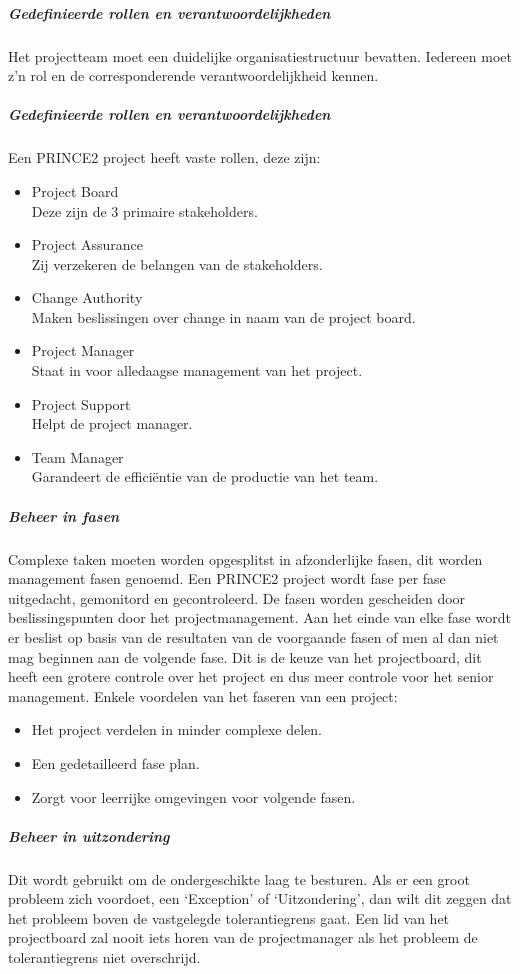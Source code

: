 \documentclass[]{article}
\begin{document}
\subparagraph{Gedefinieerde rollen en verantwoordelijkheden}
Het projectteam moet een duidelijke organisatiestructuur bevatten. Iedereen moet z’n rol en de corresponderende verantwoordelijkheid kennen.

\subparagraph{Gedefinieerde rollen en verantwoordelijkheden}
Een PRINCE2 project heeft vaste rollen, deze zijn:
\begin{itemize}
	\item Project Board \\ Deze zijn de 3 primaire stakeholders.
	\item Project Assurance \\ Zij verzekeren de belangen van de stakeholders.
	\item Change Authority \\ Maken beslissingen over change in naam van de project board.
	\item Project Manager \\ Staat in voor alledaagse management van het project.
	\item Project Support \\ Helpt de project manager.
	\item Team Manager \\ Garandeert de efficiëntie van de productie van het team.
	
\end{itemize}

\subparagraph{Beheer in fasen}
Complexe taken moeten worden opgesplitst in afzonderlijke fasen, dit worden management fasen genoemd. Een PRINCE2 project wordt fase per fase uitgedacht, gemonitord en gecontroleerd. De fasen worden gescheiden door beslissingspunten door het projectmanagement. Aan het einde van elke fase wordt er beslist op basis van de resultaten van de voorgaande fasen of men al dan niet mag beginnen aan de volgende fase. Dit is de keuze van het projectboard, dit heeft een grotere controle over het project en dus meer controle voor het senior management. Enkele voordelen van het faseren van een project:
\begin{itemize}
\item Het project verdelen in minder complexe delen.
\item Een gedetailleerd fase plan.
\item Zorgt voor leerrijke omgevingen voor volgende fasen.
\end{itemize}

\subparagraph{Beheer in uitzondering}
Dit wordt gebruikt om de ondergeschikte laag te besturen. Als er een groot probleem zich voordoet, een ‘Exception’ of ‘Uitzondering’, dan wilt dit zeggen dat het probleem boven de vastgelegde tolerantiegrens gaat. Een lid van het projectboard zal nooit iets horen van de projectmanager als het probleem de tolerantiegrens niet overschrijd.
\end{document}
